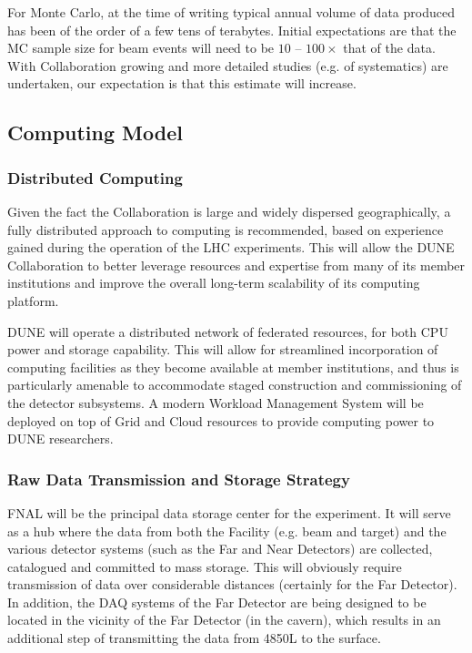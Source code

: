 For Monte Carlo, at the time of writing typical annual volume of data produced has been of the order of a few tens of terabytes.
Initial expectations are that the MC sample size for beam events will
need to be $10$ -- $100\times$ that of the data.
With Collaboration growing
and more detailed studies (e.g. of systematics) are undertaken, our
expectation is that this estimate will increase.

\subsection{Computing Model}
\label{sec:detectors-sc-infrastructure-computing-model}

\subsubsection{Distributed Computing}

Given the fact the Collaboration is large and widely dispersed geographically, a fully distributed approach to computing is recommended, based on experience
gained during the operation of the LHC experiments. This will allow the DUNE Collaboration to better leverage resources and expertise from many of its
member institutions and improve the overall long-term scalability of its computing platform.

DUNE will operate a  distributed network of federated resources, for both CPU power and storage capability. This will allow for streamlined incorporation
of computing facilities as they become available at member institutions, and thus is particularly amenable to accommodate staged construction and commissioning
of the detector subsystems. A modern Workload Management System will be deployed on top of Grid and Cloud resources to provide computing
power to DUNE researchers.

\subsubsection{Raw Data Transmission and Storage Strategy}
FNAL will be the principal data storage center for the experiment. It will serve as a hub where the data from both the Facility (e.g. beam and target)
and the various detector systems (such as the  Far and Near Detectors)  are collected, catalogued and committed to mass storage. This will obviously require transmission of
data over considerable distances (certainly for the Far Detector). In addition, the DAQ systems of the Far Detector are being designed to be located  in the vicinity of
the Far Detector (in the cavern), which results in an additional step of transmitting the data from 4850L to the surface.


